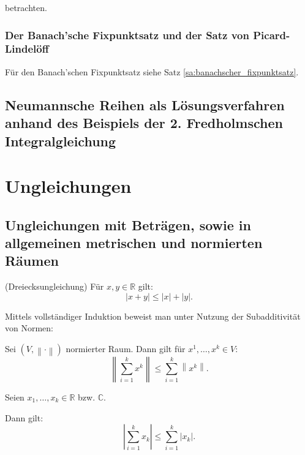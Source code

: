 \documentclass[10pt]{scrbook}
\begin{document}
betrachten.

\subsection{Der Banach'sche Fixpunktsatz und der Satz von Picard-Lindelöff}

Für den Banach'schen Fixpunktsatz siehe Satz \ref{sa:banachscher_fixpunktsatz}.

\section{Neumannsche Reihen als Lösungsverfahren anhand des Beispiels der 2. Fredholmschen Integralgleichung}

\chapter{Ungleichungen}

\section{Ungleichungen mit Beträgen, sowie in allgemeinen metrischen und normierten Räumen}

\begin{Le} (Dreiecksungleichung)
Für $x, y\in\mathbb{R}$ gilt:
\begin{equation}
\left|x+y\right|\leq \left|x\right|+\left|y\right|.
\end{equation}
\end{Le}

Mittels vollständiger Induktion beweist man unter Nutzung der Subadditivität von Normen:

\begin{Le}
Sei $(V, \left\|\cdot\right\|)$ normierter Raum. Dann gilt für $x^1, \ldots, x^k\in V$:
\begin{equation}
\left\|\sum_{i=1}^k x^k\right\|\leq \sum_{i=1}^k \left\|x^k\right\|.
\end{equation}
\end{Le}

\begin{Kor}
Seien $x_1, \ldots, x_k \in \mathbb{R}$ bzw. $\mathbb{C}$.

Dann gilt:
\begin{equation}
\left|\sum_{i=1}^k x_k\right|\leq \sum_{i=1}^k \left|x_k\right|.
\end{equation}
\end{Kor}
\end{document}
